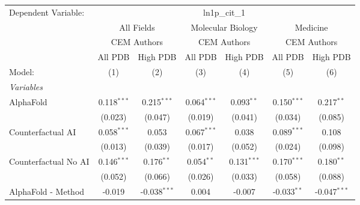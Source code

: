 \begingroup
\centering
\begin{tabular}{lcccccc}
   \tabularnewline \midrule \midrule
   Dependent Variable: & \multicolumn{6}{c}{ln1p\_cit\_1}\\
 & \multicolumn{2}{c}{All Fields} & \multicolumn{2}{c}{Molecular Biology} & \multicolumn{2}{c}{Medicine} \\
\cmidrule(lr){2-3} \cmidrule(lr){4-5} \cmidrule(lr){6-7}
 & \multicolumn{2}{c}{CEM Authors} & \multicolumn{2}{c}{CEM Authors} & \multicolumn{2}{c}{CEM Authors} \\
\cmidrule(lr){2-3} \cmidrule(lr){4-5} \cmidrule(lr){6-7}
 & \multicolumn{1}{c}{All PDB} & \multicolumn{1}{c}{High PDB} & \multicolumn{1}{c}{All PDB} & \multicolumn{1}{c}{High PDB} & \multicolumn{1}{c}{All PDB} & \multicolumn{1}{c}{High PDB} \\
\cmidrule(lr){2-2} \cmidrule(lr){3-3} \cmidrule(lr){4-4} \cmidrule(lr){5-5} \cmidrule(lr){6-6} \cmidrule(lr){7-7}
   Model:                                                     & (1)           & (2)            & (3)           & (4)           & (5)           & (6)\\  
   \midrule
   \emph{Variables}\\
   AlphaFold                                                  & 0.118$^{***}$ & 0.215$^{***}$  & 0.064$^{***}$ & 0.093$^{**}$  & 0.150$^{***}$ & 0.217$^{**}$\\   
                                                              & (0.023)       & (0.047)        & (0.019)       & (0.041)       & (0.034)       & (0.085)\\   
   Counterfactual AI                                          & 0.058$^{***}$ & 0.053          & 0.067$^{***}$ & 0.038         & 0.089$^{***}$ & 0.108\\   
                                                              & (0.013)       & (0.039)        & (0.017)       & (0.052)       & (0.024)       & (0.098)\\   
   Counterfactual No AI                                       & 0.146$^{***}$ & 0.176$^{**}$   & 0.054$^{**}$  & 0.131$^{***}$ & 0.170$^{***}$ & 0.180$^{**}$\\   
                                                              & (0.052)       & (0.066)        & (0.026)       & (0.033)       & (0.058)       & (0.088)\\   
   AlphaFold - Method                                         & -0.019        & -0.038$^{***}$ & 0.004         & -0.007        & -0.033$^{**}$ & -0.047$^{***}$\\   

\end{tabular}
